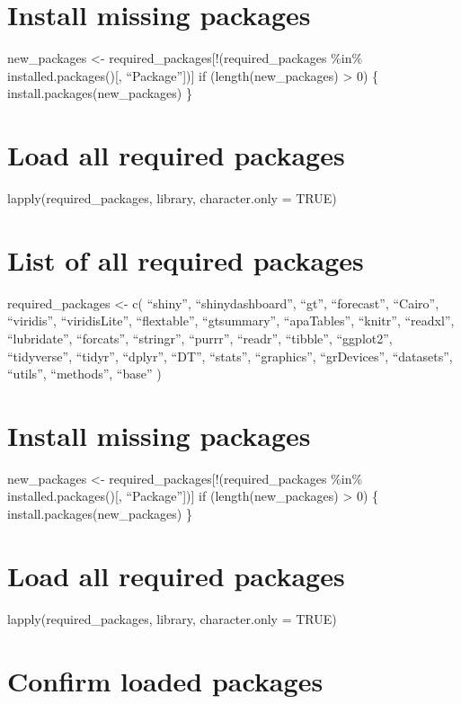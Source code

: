 \documentclass[
]{article}
\begin{document}
\section{Install missing packages}\label{install-missing-packages}

new\_packages \textless- required\_packages{[}!(required\_packages
\%in\% installed.packages(){[}, ``Package''{]}){]} if
(length(new\_packages) \textgreater{} 0) \{
install.packages(new\_packages) \}

\section{Load all required packages}\label{load-all-required-packages}

lapply(required\_packages, library, character.only = TRUE)

\section{List of all required
packages}\label{list-of-all-required-packages}

required\_packages \textless- c( ``shiny'', ``shinydashboard'', ``gt'',
``forecast'', ``Cairo'', ``viridis'', ``viridisLite'', ``flextable'',
``gtsummary'', ``apaTables'', ``knitr'', ``readxl'', ``lubridate'',
``forcats'', ``stringr'', ``purrr'', ``readr'', ``tibble'', ``ggplot2'',
``tidyverse'', ``tidyr'', ``dplyr'', ``DT'', ``stats'', ``graphics'',
``grDevices'', ``datasets'', ``utils'', ``methods'', ``base'' )

\section{Install missing packages}\label{install-missing-packages-1}

new\_packages \textless- required\_packages{[}!(required\_packages
\%in\% installed.packages(){[}, ``Package''{]}){]} if
(length(new\_packages) \textgreater{} 0) \{
install.packages(new\_packages) \}

\section{Load all required packages}\label{load-all-required-packages-1}

lapply(required\_packages, library, character.only = TRUE)

\section{Confirm loaded packages}\label{confirm-loaded-packages}
\end{document}
